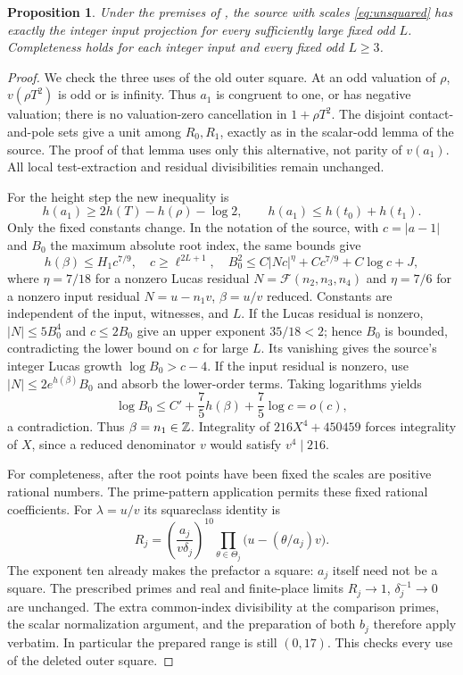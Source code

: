 \documentclass[11pt,a4paper]{article}
\newtheorem{proposition}[theorem]{Proposition}
\theoremstyle{remark}\newtheorem{remark}[theorem]{Remark}
\begin{document}
\begin{proposition}\label{prop:unsquared}
Under the premises of \cite{General}, the source with scales
\eqref{eq:unsquared} has exactly the integer input projection for every
sufficiently large fixed odd $L$. Completeness holds for each integer
input and every fixed odd $L\ge3$.
\end{proposition}
\begin{proof}
We check the three uses of the old outer square. At an odd valuation of
$\rho$, $v(\rho T^2)$ is odd or is infinity. Thus $a_1$ is congruent
to one, or has negative valuation; there is no valuation-zero
cancellation in $1+\rho T^2$. The disjoint contact-and-pole sets give
a unit among $R_0,R_1$, exactly as in the scalar-odd lemma of the source.
The proof of that lemma uses only this alternative, not parity of
$v(a_1)$. All local test-extraction and residual divisibilities remain
unchanged.

For the height step the new inequality is
\[
 h(a_1)\ge2h(T)-h(\rho)-\log2,
 \qquad h(a_1)\le h(t_0)+h(t_1).
\]
Only the fixed constants change. In the notation of the source, with
$c=|a-1|$ and $B_0$ the maximum absolute root index, the same bounds give
\[
 h(\beta)\le H_1c^{7/9},\quad c\ge\ell^{2L+1},\quad
 B_0^2\le C|Nc|^\eta+Cc^{7/9}+C\log c+J,
\]
where $\eta=7/18$ for a nonzero Lucas residual
$N=\mathcal F(n_2,n_3,n_4)$ and $\eta=7/6$ for a nonzero input
residual $N=u-n_1v$, $\beta=u/v$ reduced. Constants are independent
of the input, witnesses, and $L$. If the Lucas residual is nonzero,
$|N|\le5B_0^4$ and $c\le2B_0$ give an upper exponent $35/18<2$;
hence $B_0$ is bounded, contradicting the lower bound on $c$ for large $L$.
Its vanishing gives the source's integer Lucas growth
$\log B_0>c-4$. If the input residual is nonzero, use
$|N|\le2e^{h(\beta)}B_0$ and absorb the lower-order terms. Taking
logarithms yields
\[
 \log B_0\le C'+\frac75 h(\beta)+\frac75\log c=o(c),
\]
a contradiction. Thus $\beta=n_1\in\mathbb Z$. Integrality of
$216X^4+450459$ forces integrality of $X$, since a reduced denominator
$v$ would satisfy $v^4\mid216$.

For completeness, after the root points have been fixed the scales are
positive rational numbers. The prime-pattern application permits these
fixed rational coefficients. For $\lambda=u/v$ its squareclass identity is
\[
 R_j=\left(\frac{a_j}{v\delta_j}\right)^{10}
       \prod_{\theta\in\Theta_j}\bigl(u-(\theta/a_j)v\bigr).
\]
The exponent ten already makes the prefactor a square: $a_j$ itself
need not be a square. The prescribed primes and real and finite-place
limits $R_j\to1$, $\delta_j^{-1}\to0$ are unchanged. The extra
common-index divisibility at the comparison primes, the scalar
normalization argument, and the preparation of both $b_j$ therefore
apply verbatim. In particular the prepared range is still $(0,17)$.
This checks every use of the deleted outer square.
\end{proof}
\end{document}
